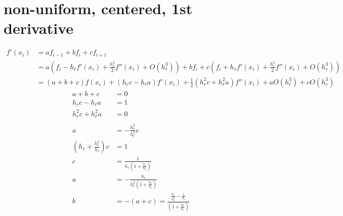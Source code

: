 \documentclass{article}
\begin{document}
\section{non-uniform, centered, 1st derivative}
\begin{align}
    f'\left( x_i \right) &= af_{i-1} + bf_{i} + cf_{i+1}
    \\
    &= a\left( f_{i} - h_{\ell}f'\left( x_i \right) + \frac{h_{\ell}^2}{2}f''\left( x_i \right) + O\left( h_{\ell}^3 \right)\right)
    + bf_{i}
    + c\left( f_{i} + h_{r}f'\left( x_i \right) + \frac{h_{r}^2}{2}f''\left( x_i \right) + O\left( h_{r}^3 \right)\right)
    \\
    &= \left( a + b + c \right)f\left( x_i \right)
    + \left( h_{r}c - h_{\ell}a \right)f'\left( x_i \right)
    + \frac{1}{2}\left( h_{r}^{2}c + h_{\ell}^{2}a \right)f''\left( x_i \right)
    + aO\left( h_{\ell}^3 \right) + cO\left( h_r^3 \right)
    \label{}
\end{align}
\begin{align}
    a + b + c &= 0
    \\
    h_{r}c - h_{\ell}a &= 1
    \\
    h_{r}^2c + h_{\ell}^2a &= 0
    \\ \nonumber
    \\
    a &= -\frac{h_{r}^2}{h_{\ell}^2}c
    \\
    \left( h_{r} + \frac{h_{r}^2}{h_{\ell}} \right)c &= 1
    \\
    c &= \frac{1}{h_{r}\left( 1 + \frac{h_r}{h_{\ell}} \right)}
    \\
    a &= -\frac{h_{r}}{h_{\ell}^2\left( 1 + \frac{h_r}{h_{\ell}} \right)}
    \\
    b &= -\left( a + c \right) = \frac{\frac{h_r}{h_{\ell}^2} - \frac{1}{h_r}}{\left( 1 + \frac{h_r}{h_{\ell}} \right)}
    \label{}
\end{align}
\end{document}
